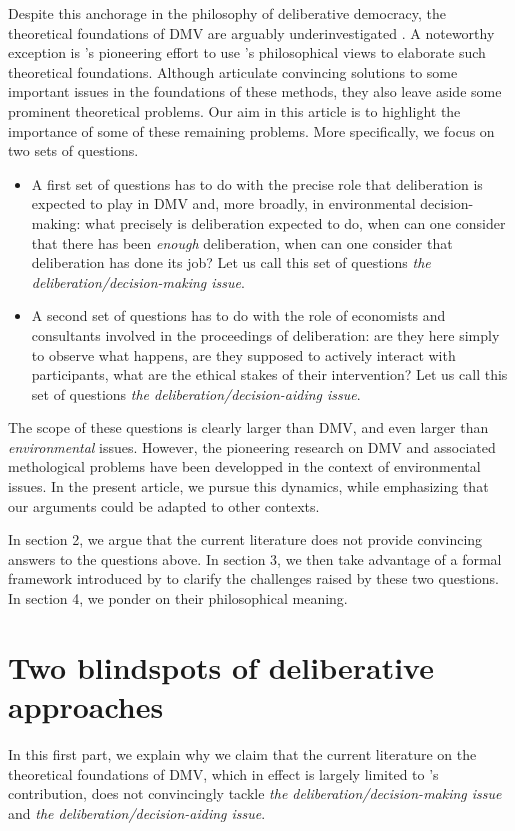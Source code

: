 \documentclass[version=3.21, pagesize, twoside=off, bibliography=totoc, DIV=calc, fontsize=12pt, a4paper, french, english]{scrartcl}
\begin{document}
Despite this anchorage in the philosophy of deliberative democracy, the theoretical foundations of DMV are arguably underinvestigated \citep{bartkowski_economic_2017,bartkowski_beyond_2018,bunse_what_2015,kenter_what_2015}. 
A noteworthy exception is \citet{bartkowski_beyond_2018}'s pioneering effort to use \citet{sen_idea_2009}'s philosophical views to elaborate such theoretical foundations. 
Although \citet{bartkowski_beyond_2018} articulate convincing solutions to some important issues in the foundations of these methods, they also leave aside some prominent theoretical problems. 
Our aim in this article is to highlight the importance of some of these remaining problems. 
More specifically, we focus on two sets of questions.
\begin{itemize}
\item A first set of questions has to do with the precise role that deliberation is expected to play in DMV and, more broadly, in environmental decision-making: what precisely is deliberation expected to do, when can one consider that there has been \emph{enough} deliberation, when can one consider that deliberation has done its job?
Let us call this set of questions \emph{the deliberation/decision-making issue}.
\item A second set of questions has to do with the role of economists and consultants involved in the proceedings of deliberation: are they here simply to observe what happens, are they supposed to actively interact with participants, what are the ethical stakes of their intervention? 
Let us call this set of questions \emph{the deliberation/decision-aiding issue}.
\end{itemize}
The scope of these questions is clearly larger than DMV, and even larger than \emph{environmental} issues. 
However, the pioneering research on DMV and associated methological problems have been developped in the context of environmental issues. 
In the present article, we pursue this dynamics, while emphasizing that our arguments could be adapted to other contexts.

In section 2, we argue that the current literature does not provide convincing answers to the questions above. 
In section 3, we then take advantage of a formal framework introduced by \citet{cailloux_formal_2018} to clarify the challenges raised by these two questions.
In section 4, we ponder on their philosophical meaning.

\section{Two blindspots of deliberative approaches}
In this first part, we explain why we claim that the current literature on the theoretical foundations of DMV, which in effect is largely limited to \citet{bartkowski_beyond_2018}'s contribution, does not convincingly tackle \emph{the deliberation/decision-making issue} and \emph{the deliberation/decision-aiding issue}.
\end{document}
